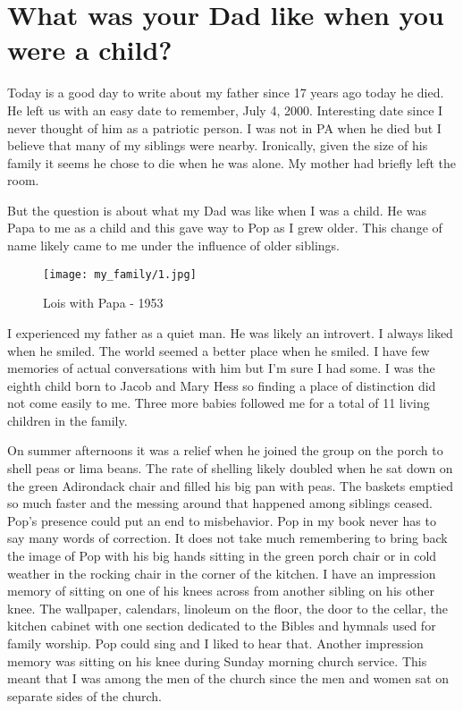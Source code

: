 \section{What was your Dad like when you were a child?}

Today is a good day to write about my father since 17 years ago today he died.
He left us with an easy date to remember, July 4, 2000.
Interesting date since I never thought of him as a patriotic person.
I was not in PA when he died but I believe that many of my siblings were nearby.
Ironically, given the size of his family it seems he chose to die when he was alone.
My mother had briefly left the room.

But the question is about what my Dad was like when I was a child.
He was Papa to me as a child and this gave way to Pop as I grew older.
This change of name likely came to me under the influence of older siblings.

\begin{figure}
\centering
\texttt{[image: my\_family/1.jpg]}
\caption{Lois with Papa - 1953}
\end{figure}
I experienced my father as a quiet man.
He was likely an introvert.
I always liked when he smiled.
The world seemed a better place when he smiled.
I have few memories of actual conversations with him but I'm sure I had some.
I was the eighth child born to Jacob and Mary Hess so finding a place of distinction did not come easily to me.
Three more babies followed me for a total of 11 living children in the family.

On summer afternoons it was a relief when he joined the group on the porch to shell peas or lima beans.
The rate of shelling likely doubled when he sat down on the green Adirondack chair and filled his big pan with peas.
The baskets emptied so much faster and the messing around that happened among siblings ceased.
Pop's presence could put an end to misbehavior.
Pop in my book never has to say many words of correction.
It does not take much remembering to bring back the image of Pop with his big hands sitting in the green porch chair or in cold weather in the rocking chair in the corner of the kitchen.
I have an impression memory of sitting on one of his knees across from another sibling on his other knee.
The wallpaper, calendars, linoleum on the floor, the door to the cellar, the kitchen cabinet with one section dedicated to the Bibles and hymnals used for family worship.
Pop could sing and I liked to hear that.
Another impression memory was sitting on his knee during Sunday morning church service.
This meant that I was among the men of the church since the men and women sat on separate sides of the church.

